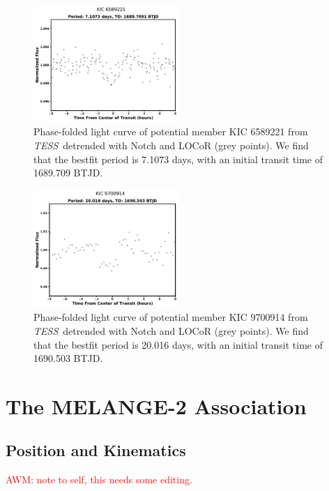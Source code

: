 \documentclass[twocolumn]{aastex631}
\newcommand{\tess}{\textit{TESS}}
\begin{document}
\begin{figure}[tb]
    \centering
    \includegraphics[width=0.49\textwidth]{KIC6589221LC.pdf}
    \caption{Phase-folded light curve of potential member KIC 6589221 from \tess\ detrended with Notch and LOCoR (grey points). We find that the bestfit period is 7.1073 days, with an initial transit time of 1689.709 BTJD. }
    \label{fig:kic221transit}
\end{figure}

\begin{figure}[tb]
    \centering
    \includegraphics[width=0.49\textwidth]{KIC9700914LC.pdf}
    \caption{Phase-folded light curve of potential member KIC 9700914 from \tess\ detrended with Notch and LOCoR (grey points). We find that the bestfit period is 20.016 days, with an initial transit time of 1690.503 BTJD. }
    \label{fig:kic914transit}
\end{figure}



\section{The MELANGE-2 Association}\label{sec:cluster}

\subsection{Position and Kinematics}


\textcolor{red}{AWM: note to self, this needs some editing. }
\end{document}
